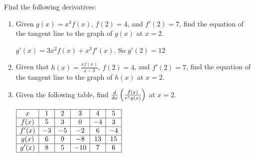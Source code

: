 \documentclass[nooutcomes]{ximera}
\begin{document}
\begin{problem}
Find the following derivatives:
	\begin{enumerate}
	
	\item  Given $g(x) = x^3 f(x)$, $f(2) = 4$, and $f'(2) = 7$, find the equation of the tangent line to the graph of $g(x)$ at $x=2$.
		\begin{freeResponse}
		$g'(x) = 3x^2 f(x) + x^3 f'(x)$.  So $g'(2) = 12$
		\end{freeResponse}
		
		
		
	\item  Given that $h(x) = \frac{x f(x)}{x-3}$, $f(2) = 4$, and $f'(2) = 7$, find the equation of the tangent line to the graph of $h(x)$ at $x=2$.  
		\begin{freeResponse}
		
		\end{freeResponse}
		
		
		
	\item  Given the following table, find $\frac{d}{dx} \left( \frac{f(x)}{e^x g(x)} \right)$ at $x=2$. 
	
	$\begin{array}{|c|c|c|c|c|c|}
	\hline
	x	&	1	&	2	&	3	&	4	&	5	\\
	\hline
	f(x)	&	5	&	3	&	0	&	-4	&	3	\\
	\hline
	f'(x)	&	-3	&	-5	&	-2	&	6	&	-4	\\
	\hline
	g(x)	&	6	&	9	&	-8	&	13	&	15	\\
	\hline
	g'(x)	&	8	&	5	&	-10	&	7	&	6	\\
	\hline
	\end{array}$
	
	 
		\begin{freeResponse}
		
		\end{freeResponse}
		
		
		
	\end{enumerate}
		
\end{problem}







	
	
	
	
	
	
	
	
	

	










								
				
				
	
\end{document}
